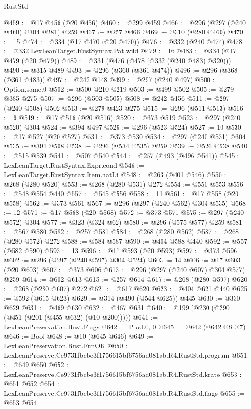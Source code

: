 \begin{lexlean}{RustStd}
\begin{coremodule}
@459 := @17 @456 (@20 @456)
@460 := @299 @459
@466 := @296 (@297 (@240 @460) @304 @281) @259
@467 := @257 @466
@469 := @310 (@280 @460)
@470 := 15
@474 := @334 (@17 @470 (@20 @470))
@476 := @332 (@240 @474)
@478 := @332 LexLeanTarget.RustSyntax.Pat.wild
@479 := 16
@483 := @334 (@17 @479 (@20 @479))
@489 := @331 (@476 (@478 (@332 (@240 @483) @320)))
@490 := @315 @489
@493 := @296 (@360 (@361 @474))
@496 := @296 (@368 (@361 @483))
@497 := @242 @148
@499 := @297 (@240 @497)
@500 := Option.some.{0}
@502 := @500 @210 @219
@503 := @499 @502
@505 := @279 @385 @275
@507 := @296 (@503 @505)
@508 := @242 @156
@511 := @297 (@240 @508) @502
@513 := @279 @423 @275
@515 := @296 (@511 @513)
@516 := 9
@519 := @17 @516 (@20 @516)
@520 := @373 @519
@523 := @297 (@240 @520) @304
@524 := @394 @497
@526 := @296 (@523 @524)
@527 := 10
@530 := @17 @527 (@20 @527)
@531 := @373 @530
@534 := @297 (@240 @531) @304
@535 := @394 @508
@538 := @296 (@534 @535) @259
@539 := @526 @538
@540 := @515 @539
@541 := @507 @540
@544 := @257 (@493 (@496 @541))
@545 := LexLeanTarget.RustSyntax.Expr.cond
@546 := LexLeanTarget.RustSyntax.Item.natLt
@548 := @263 (@401 @546)
@550 := @268 (@280 @520)
@553 := @268 (@280 @531) @272
@554 := @550 @553
@556 := @548 @554 @440
@557 := @545 @556
@558 := 11
@561 := @17 @558 (@20 @558)
@562 := @373 @561
@567 := @296 (@297 (@240 @562) @304 @535)
@568 := 12
@571 := @17 @568 (@20 @568)
@572 := @373 @571
@575 := @297 (@240 @572) @304
@577 := @323 (@324 @62)
@580 := @296 (@575 @577) @259
@581 := @567 @580
@582 := @257 @581
@584 := @268 (@280 @562)
@587 := @268 (@280 @572) @272
@588 := @584 @587
@590 := @404 @588 @440
@592 := @557 (@582 @590)
@593 := 13
@596 := @17 @593 (@20 @593)
@597 := @373 @596
@602 := @296 (@297 (@240 @597) @304 @524)
@603 := 14
@606 := @17 @603 (@20 @603)
@607 := @373 @606
@613 := @296 (@297 (@240 @607) @304 @577) @259
@614 := @602 @613
@615 := @257 @614
@617 := @268 (@280 @597)
@620 := @268 (@280 @607) @272
@621 := @617 @620
@623 := @404 @621 @440
@625 := @592 (@615 @623)
@629 := @314 (@490 (@544 @625)) @445
@630 := @330 @629
@631 := @469 @630
@632 := @467 @631
@640 := @199 (@230 (@290 (@451 (@201 (@455 @632) (@10 @200)))))
@641 := LexLeanPreservation.Rust.Flags
@642 := Prod.{0, 0}
@645 := @642 (@642 @8 @7)
@646 := Bool
@648 := @10 (@645 @646)
@649 := LexLeanPreservation.Rust.FunOK
@650 := LexLeanPreserve.Ce9731fbcbe3f1756615bf6756ad081ab.R4.RustStd.program
@651 := @649 @650
@652 := LexLeanPreserve.Ce9731fbcbe3f1756615bf6756ad081ab.R4.RustStd.krate
@653 := @651 @652
@654 := LexLeanPreserve.Ce9731fbcbe3f1756615bf6756ad081ab.R4.RustStd.flags
@655 := @653 @654

\end{coremodule}
\end{lexlean}
